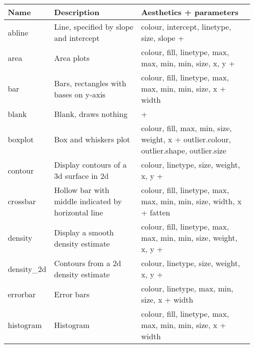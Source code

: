 \begin{table}
  \begin{center}
  \begin{tabular}{lp{2.5in}p{2.5in}}
    \toprule
    Name & Description & Aesthetics + parameters \\
    \midrule
    abline       & Line, specified by slope and intercept                                        & colour, intercept, linetype, size, slope +                                           \\
    area         & Area plots                                                                    & colour, fill, linetype, max, max, min, min, size, x, y +                             \\
    bar          & Bars, rectangles with bases on y-axis                                         & colour, fill, linetype, max, max, min, min, size, x + width                          \\
    blank        & Blank, draws nothing                                                          &  +                                                                                   \\
    boxplot      & Box and whiskers plot                                                         & colour, fill, max, min, size, weight, x + outlier.colour, outlier.shape, outlier.size\\
    contour      & Display contours of a 3d surface in 2d                                        & colour, linetype, size, weight, x, y +                                               \\
    crossbar     & Hollow bar with middle indicated by horizontal line                           & colour, fill, linetype, max, max, min, min, size, width, x + fatten                  \\
    density      & Display a smooth density estimate                                             & colour, fill, linetype, max, max, min, min, size, weight, x, y +                     \\
    density\_2d & Contours from a 2d density estimate                                           & colour, linetype, size, weight, x, y +                                               \\
    errorbar     & Error bars                                                                    & colour, linetype, max, min, size, x + width                                          \\
    histogram    & Histogram                                                                     & colour, fill, linetype, max, max, min, min, size, x + width                          \\

\end{tabular}
\end{center}
\end{table}
